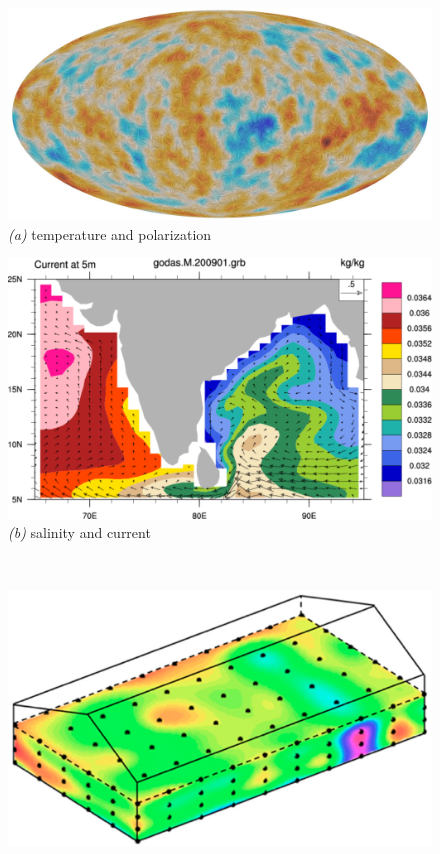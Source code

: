 \documentclass{article}
\newenvironment{hoggfigure}{%
  \begin{figure}[tp]%
    \begin{mdframed}%
    \color{captiongray}}{%
    \end{mdframed}%
  \end{figure}}
\theoremstyle{plain}
\begin{document}
\begin{hoggfigure}
  \begin{center}
    \begin{minipage}[b]{2.5in}\noindent%
      \includegraphics[width=\textwidth]{jpegPIA18916.jpeg}\\
      \textsl{(a)} temperature and polarization
    \end{minipage}
    \begin{minipage}[b]{2in}\noindent%
      \includegraphics[width=\textwidth]{key_figures_197.pdf}\\
      \textsl{(b)} salinity and current
    \end{minipage}\\[2ex]
    \begin{minipage}[b]{2.5in}\noindent%
      \includegraphics[width=\textwidth]{applsci-09-02108-g001.png}\\

\end{minipage}
\end{center}
\end{hoggfigure}
\end{document}
